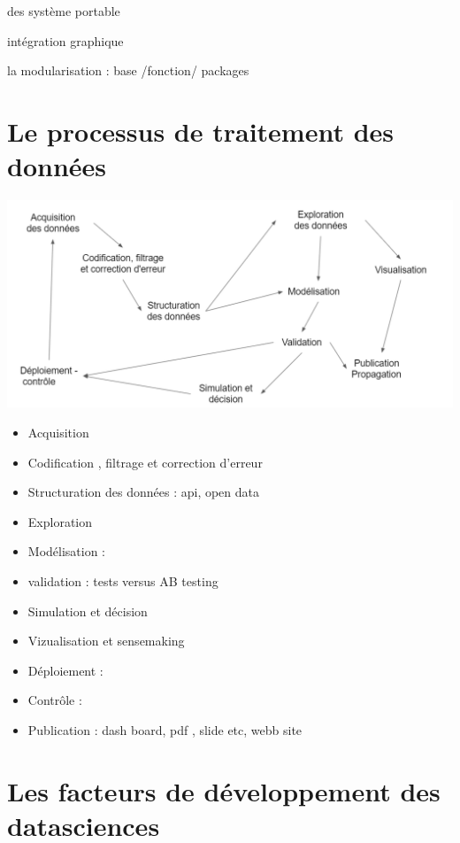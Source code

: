 \documentclass[
]{book}
\providecommand{\tightlist}{%
  \setlength{\itemsep}{0pt}\setlength{\parskip}{0pt}}
\begin{document}
des système portable

intégration graphique

la modularisation : base /fonction/ packages

\hypertarget{le-processus-de-traitement-des-donnuxe9es}{%
\section{Le processus de traitement des données}\label{le-processus-de-traitement-des-donnuxe9es}}

\includegraphics{./Images/datascience2.png}

\begin{itemize}
\tightlist
\item
  Acquisition
\item
  Codification , filtrage et correction d'erreur
\item
  Structuration des données : api, open data
\item
  Exploration
\item
  Modélisation :
\item
  validation : tests versus AB testing
\item
  Simulation et décision
\item
  Vizualisation et sensemaking
\item
  Déploiement :
\item
  Contrôle :
\item
  Publication : dash board, pdf , slide etc, webb site
\end{itemize}

\hypertarget{les-facteurs-de-duxe9veloppement-des-datasciences}{%
\section{Les facteurs de développement des datasciences}\label{les-facteurs-de-duxe9veloppement-des-datasciences}}
\end{document}
